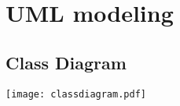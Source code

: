 \section{UML modeling}
\subsection{Class Diagram}
\begin{sidewaysfigure}
\centerline{
	\vspace{0.2in}
    \texttt{[image: classdiagram.pdf]}
}
\end{sidewaysfigure}
